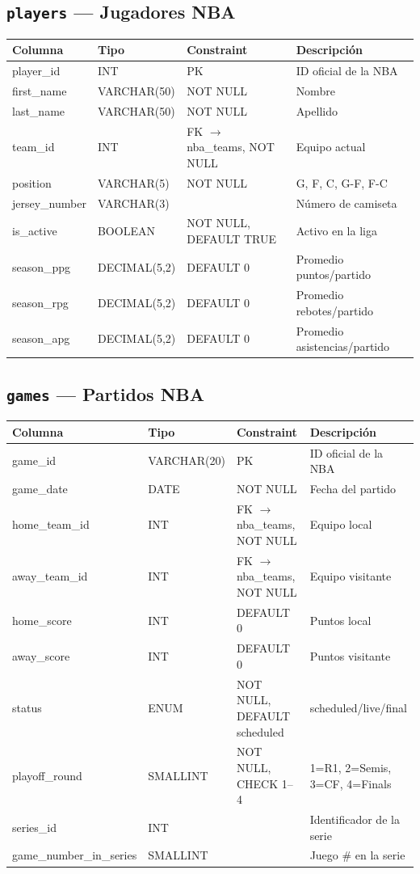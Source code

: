 \documentclass[12pt,a4paper]{article}
\begin{document}
\subsection{\texttt{players} --- Jugadores NBA}
\begin{tabular}{>{\ttfamily\small}l l l p{5cm}}
\toprule
\normalfont\textbf{Columna} & \textbf{Tipo} & \textbf{Constraint} & \textbf{Descripci\'on} \\
\midrule
player\_id & INT & PK & ID oficial de la NBA \\
first\_name & VARCHAR(50) & NOT NULL & Nombre \\
last\_name & VARCHAR(50) & NOT NULL & Apellido \\
team\_id & INT & FK $\to$ nba\_teams, NOT NULL & Equipo actual \\
position & VARCHAR(5) & NOT NULL & G, F, C, G-F, F-C \\
jersey\_number & VARCHAR(3) & & N\'umero de camiseta \\
is\_active & BOOLEAN & NOT NULL, DEFAULT TRUE & Activo en la liga \\
season\_ppg & DECIMAL(5,2) & DEFAULT 0 & Promedio puntos/partido \\
season\_rpg & DECIMAL(5,2) & DEFAULT 0 & Promedio rebotes/partido \\
season\_apg & DECIMAL(5,2) & DEFAULT 0 & Promedio asistencias/partido \\
\bottomrule
\end{tabular}

\subsection{\texttt{games} --- Partidos NBA}
\begin{tabular}{>{\ttfamily\small}l l l p{4.5cm}}
\toprule
\normalfont\textbf{Columna} & \textbf{Tipo} & \textbf{Constraint} & \textbf{Descripci\'on} \\
\midrule
game\_id & VARCHAR(20) & PK & ID oficial de la NBA \\
game\_date & DATE & NOT NULL & Fecha del partido \\
home\_team\_id & INT & FK $\to$ nba\_teams, NOT NULL & Equipo local \\
away\_team\_id & INT & FK $\to$ nba\_teams, NOT NULL & Equipo visitante \\
home\_score & INT & DEFAULT 0 & Puntos local \\
away\_score & INT & DEFAULT 0 & Puntos visitante \\
status & ENUM & NOT NULL, DEFAULT scheduled & scheduled/live/final \\
playoff\_round & SMALLINT & NOT NULL, CHECK 1--4 & 1=R1, 2=Semis, 3=CF, 4=Finals \\
series\_id & INT & & Identificador de la serie \\
game\_number\_in\_series & SMALLINT & & Juego \# en la serie \\
\bottomrule
\end{tabular}
\end{document}
